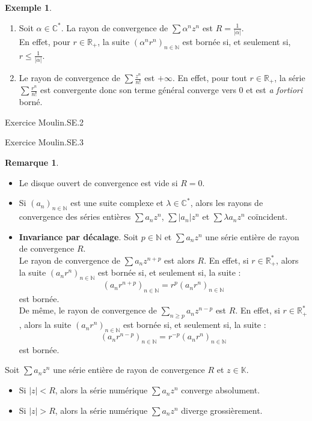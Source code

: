 \documentclass[french]{article}
\newcommand{\N}{\mathbb{N}}
\newcommand{\R}{\mathbb{R}}
\newcommand{\C}{\mathbb{C}}
\newcommand{\K}{\mathbb{K}}
\newcommand{\st}{^*}
\theoremstyle{plain}
\theoremstyle{definition}
\newtheorem*{ex}{Exemple}
\newtheorem*{rmq}{Remarque}
\theoremstyle{remark}
\begin{document}
\begin{ex}%
	\begin{enumerate}
		\item Soit $\alpha\in\C\st$. La rayon de convergence de $\displaystyle\sum\alpha^nz^n$ est $R=\displaystyle\frac{1}{\lvert\alpha\rvert}$. \\
		En effet, pour $r\in\R_+$, la suite $(\alpha^nr^n)_{n\in\N}$ est bornée si, et seulement si, $r\leqslant\displaystyle\frac{1}{\lvert\alpha\rvert}$.
		\item Le rayon de convergence de $\displaystyle\sum\frac{z^n}{n!}$ est $+\infty$. En effet, pour tout $r\in\R_+$, la série $\displaystyle\sum\frac{r^n}{n!}$ est convergente donc son terme général converge vers $0$ et est \textit{a fortiori} borné.
	\end{enumerate}
\end{ex}

Exercice Moulin.SE.2

Exercice Moulin.SE.3

\begin{rmq}%
	\begin{itemize}
		\item Le disque ouvert de convergence est vide si $R=0$.
		\item Si $(a_n)_{n\in\N}$ est une suite complexe et $\lambda\in\C\st$, alors les rayons de convergence des séries entières $\displaystyle\sum a_nz^n$, $\displaystyle\sum\lvert a_n\rvert z^n$ et $\displaystyle\sum\lambda a_nz^n$ coïncident.
		\item \textbf{Invariance par décalage}. Soit $p\in\N$ et $\displaystyle\sum a_nz^n$ une série entière de rayon de convergence $R$. \\
		Le rayon de convergence de $\displaystyle\sum a_nz^{n+p}$ est alors $R$. En effet, si $r\in\R_+\st$, alors la suite $(a_nr^n)_{n\in\N}$ est bornée  si, et seulement si, la suite : $$(a_nr^{n+p})_{n\in\N}=r^p(a_nr^n)_{n\in\N}$$ est bornée. \\
		De même, le rayon de convergence de $\displaystyle\sum_{n\geqslant p}a_nz^{n-p}$ est $R$. En effet, si $r\in\R_+\st$, alors la suite $(a_nr^n)_{n\in\N}$ est bornée  si, et seulement si, la suite : $$(a_nr^{n-p})_{n\in\N}=r^{-p}(a_nr^n)_{n\in\N}$$ est bornée.
	\end{itemize}
\end{rmq}

\begin{prop}%
	Soit $\displaystyle\sum a_nz^n$ une série entière de rayon de convergence $R$ et $z\in\K$.
	\begin{itemize}
		\item Si $\lvert z\rvert <R$, alors la série numérique $\displaystyle\sum a_nz^n$ converge absolument.
		\item Si $\lvert z\rvert >R$, alors la série numérique $\displaystyle\sum a_nz^n$ diverge grossièrement.
	\end{itemize}
\end{prop}
\end{document}
